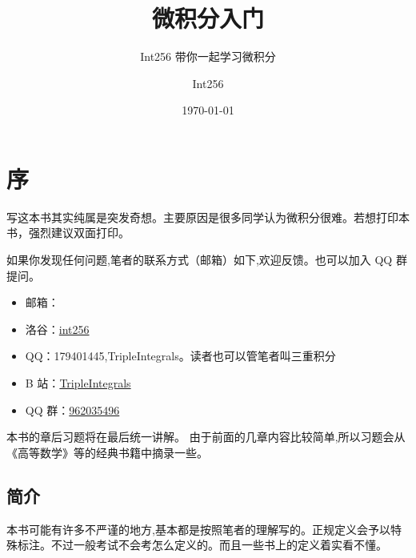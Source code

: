 \documentclass[lang=cn,10pt,twoside]{elegantbook}
\title{微积分入门}
\subtitle{Int256 带你一起学习微积分}
\author{Int256}
\date{\today}
\begin{document}
\maketitle
\frontmatter

\tableofcontents

\mainmatter

\chapter{序}

写这本书其实纯属是突发奇想。主要原因是很多同学认为微积分很难。若想打印本书，强烈建议双面打印。

如果你发现任何问题,笔者的联系方式（邮箱）如下,欢迎反馈。也可以加入 QQ 群提问。

\begin{itemize}
  \item 邮箱：
  \item 洛谷：\href{https://www.luogu.com.cn/user/344700}{int256}
  \item QQ：179401445,TripleIntegrals。读者也可以管笔者叫三重积分
  \item B 站：\href{https://space.bilibili.com/565436033}{TripleIntegrals}
  \item QQ 群：\href{https://jq.qq.com/?_wv=1027&k=lpfM484S}{962035496}
\end{itemize}

本书的章后习题将在最后统一讲解。
由于前面的几章内容比较简单,所以习题会从《高等数学》等的经典书籍中摘录一些。

\section{简介}

本书可能有许多不严谨的地方,基本都是按照笔者的理解写的。正规定义会予以特殊标注。不过一般考试不会考怎么定义的。而且一些书上的定义着实看不懂。
\end{document}
